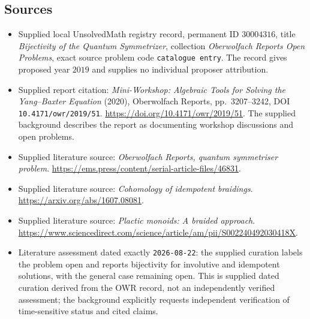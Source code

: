 \documentclass[11pt]{article}
\begin{document}
\subsection{Sources}
\begin{itemize}
\item Supplied local UnsolvedMath registry record, permanent ID \(30004316\), title \emph{Bijectivity of the Quantum Symmetrizer}, collection \emph{Oberwolfach Reports Open Problems}, exact source problem code \texttt{catalogue entry}. The record gives proposed year \(2019\) and supplies no individual proposer attribution.
\item Supplied report citation: \emph{Mini-Workshop: Algebraic Tools for Solving the Yang--Baxter Equation} (2020), Oberwolfach Reports, pp.\ 3207--3242, DOI \texttt{10.4171/owr/2019/51}. \url{https://doi.org/10.4171/owr/2019/51}. The supplied background describes the report as documenting workshop discussions and open problems.
\item Supplied literature source: \emph{Oberwolfach Reports, quantum symmetriser problem}. \url{https://ems.press/content/serial-article-files/46831}.
\item Supplied literature source: \emph{Cohomology of idempotent braidings}. \url{https://arxiv.org/abs/1607.08081}.
\item Supplied literature source: \emph{Plactic monoids: A braided approach}. \url{https://www.sciencedirect.com/science/article/am/pii/S002240492030418X}.
\item Literature assessment dated exactly \texttt{2026-08-22}: the supplied curation labels the problem open and reports bijectivity for involutive and idempotent solutions, with the general case remaining open. This is supplied dated curation derived from the OWR record, not an independently verified assessment; the background explicitly requests independent verification of time-sensitive status and cited claims.
\end{itemize}
\end{document}
